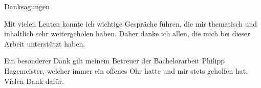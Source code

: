 \begin{center} 
	\huge Danksagungen
\end{center}
Mit vielen Leuten konnte ich wichtige Gespräche führen, die mir thematisch und inhaltlich sehr weitergeholen haben. Daher danke ich allen, die mich bei dieser Arbeit unterstützt haben.\par

Ein besonderer Dank gilt meinem Betreuer der Bachelorarbeit Philipp Hagemeister, welcher immer ein offenes Ohr hatte und mir stets geholfen hat. Vielen Dank dafür.
